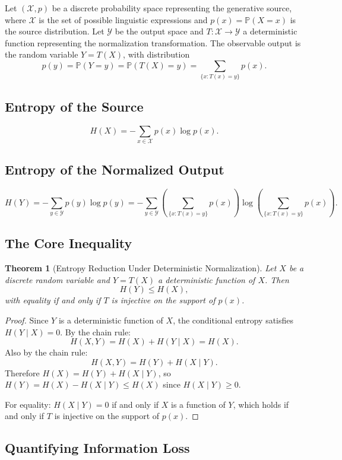 \documentclass[12pt,a4paper]{article}
\theoremstyle{definition}
\theoremstyle{plain}
\newtheorem{theorem}[definition]{Theorem}
\theoremstyle{remark}
\newcommand{\calX}{\mathcal{X}}
\newcommand{\calY}{\mathcal{Y}}
\newcommand{\Prob}{\mathbb{P}}
\begin{document}
Let $(\calX, p)$ be a discrete probability space representing the generative source, where
$\calX$ is the set of possible linguistic expressions and $p(x) = \Prob(X = x)$ is the
source distribution. Let $\calY$ be the output space and $T : \calX \to \calY$ a deterministic
function representing the normalization transformation. The observable output is the random
variable $Y = T(X)$, with distribution
\[
p(y) = \Prob(Y = y) = \Prob(T(X) = y) = \sum_{\{x : T(x) = y\}} p(x).
\]

\subsection{Entropy of the Source}

\[
H(X) = -\sum_{x \in \calX} p(x) \log p(x).
\]

\subsection{Entropy of the Normalized Output}

\[
H(Y) = -\sum_{y \in \calY} p(y) \log p(y) = -\sum_{y \in \calY}
\left(\sum_{\{x : T(x) = y\}} p(x)\right) \log \left(\sum_{\{x : T(x) = y\}} p(x)\right).
\]

\subsection{The Core Inequality}

\begin{theorem}[Entropy Reduction Under Deterministic Normalization]
Let $X$ be a discrete random variable and $Y = T(X)$ a deterministic function of $X$. Then
\[
H(Y) \leq H(X),
\]
with equality if and only if $T$ is injective on the support of $p(x)$.
\end{theorem}

\begin{proof}
Since $Y$ is a deterministic function of $X$, the conditional entropy satisfies
$H(Y \mid X) = 0$. By the chain rule:
\[
H(X, Y) = H(X) + H(Y \mid X) = H(X).
\]
Also by the chain rule:
\[
H(X, Y) = H(Y) + H(X \mid Y).
\]
Therefore $H(X) = H(Y) + H(X \mid Y)$, so $H(Y) = H(X) - H(X \mid Y) \leq H(X)$ since
$H(X \mid Y) \geq 0$.

For equality: $H(X \mid Y) = 0$ if and only if $X$ is a function of $Y$, which holds if and
only if $T$ is injective on the support of $p(x)$.
\end{proof}

\subsection{Quantifying Information Loss}
\end{document}
